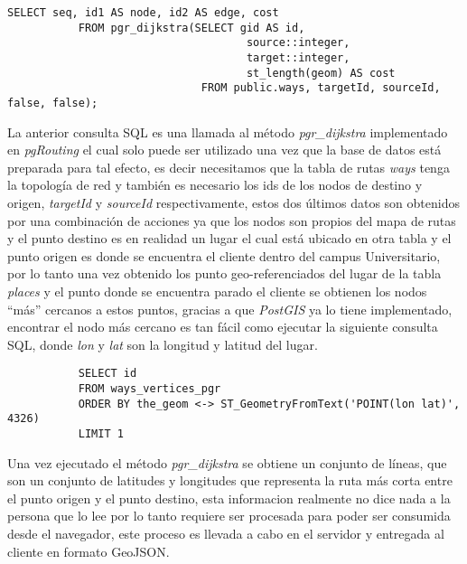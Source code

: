        \begin{center}
         \begin{lstlisting}[label=pgr_dijkstra,caption=Algoritmo de Dijkstra implementado en \emph{pgRouting}]
           SELECT seq, id1 AS node, id2 AS edge, cost
           FROM pgr_dijkstra(SELECT gid AS id,
                                     source::integer,
                                     target::integer,
                                     st_length(geom) AS cost
                              FROM public.ways, targetId, sourceId, false, false);
         \end{lstlisting}
       \end{center}


       La anterior consulta SQL es una llamada al método \emph{pgr\_dijkstra} implementado en \emph{pgRouting} el cual solo puede ser utilizado una vez que la base de datos está preparada para tal efecto, es decir necesitamos que la tabla de rutas \emph{ways} tenga la topología de red y también es necesario los ids de los nodos de destino y origen, \emph{targetId} y \emph{sourceId} respectivamente, estos dos últimos datos son obtenidos por una combinación de acciones ya que los nodos son propios del mapa de rutas y el punto destino es en realidad un lugar el cual está ubicado en otra tabla y el punto origen es donde se encuentra el cliente dentro del campus Universitario, por lo tanto una vez obtenido los punto geo-referenciados del lugar de la tabla \emph{places} y el punto donde se encuentra parado el cliente se obtienen los nodos ``más'' cercanos a estos puntos, gracias a que \emph{PostGIS} ya lo tiene implementado, encontrar el nodo más cercano es tan fácil como ejecutar la siguiente consulta SQL, donde \emph{lon} y \emph{lat} son la longitud y latitud del lugar.

       \begin{verbatim}
           SELECT id
           FROM ways_vertices_pgr
           ORDER BY the_geom <-> ST_GeometryFromText('POINT(lon lat)', 4326)
           LIMIT 1
       \end{verbatim}

       Una vez ejecutado el método \emph{pgr\_dijkstra} se obtiene un conjunto de líneas, que son un conjunto de latitudes y longitudes que representa la ruta más corta entre el punto origen y el punto destino, esta informacion realmente no dice nada a la persona que lo lee por lo tanto requiere ser procesada para poder ser consumida desde el navegador, este proceso es llevada a cabo en el servidor y entregada al cliente en formato GeoJSON.\\


